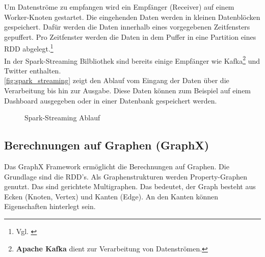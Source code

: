 \noindent
Um Datenströme zu empfangen wird ein Empfänger (Receiver) auf einem Worker-Knoten gestartet. Die eingehenden Daten werden in kleinen Datenblöcken gespeichert. Dafür werden die Daten innerhalb eines vorgegebenen Zeitfensters gepuffert. Pro Zeitfenster werden die Daten in dem Puffer in eine Partition eines RDD abgelegt.\footnote{Vgl. \cite[123-130]{BDS16}} \\

\noindent
In der Spark-Streaming Bilbliothek sind bereits einige Empfänger wie Kafka\footnote{\textbf{Apache Kafka} dient zur Verarbeitung von Datenströmen.} und Twitter enthalten. \\
\autoref{fig:spark_streaming} zeigt den Ablauf vom Eingang der Daten über die Verarbeitung bis hin zur Ausgabe. Diese Daten können zum Beispiel auf einem Dashboard ausgegeben oder in einer Datenbank gespeichert werden.

\begin{figure}[h]
  \centering
  \caption{Spark-Streaming Ablauf \cite{INFOQ_STREAMING}}\label{fig:spark_streaming}
\end{figure}





\newpage
\subsection{Berechnungen auf Graphen (GraphX)}

Das GraphX Framework ermöglicht die Berechnungen auf Graphen. Die Grundlage sind die RDD's. Als Graphenstrukturen werden Property-Graphen genutzt.
Das sind gerichtete Multigraphen. Das bedeutet, der Graph besteht aus Ecken (Knoten, Vertex) und Kanten (Edge). An den Kanten können Eigenschaften hinterlegt sein.\\

